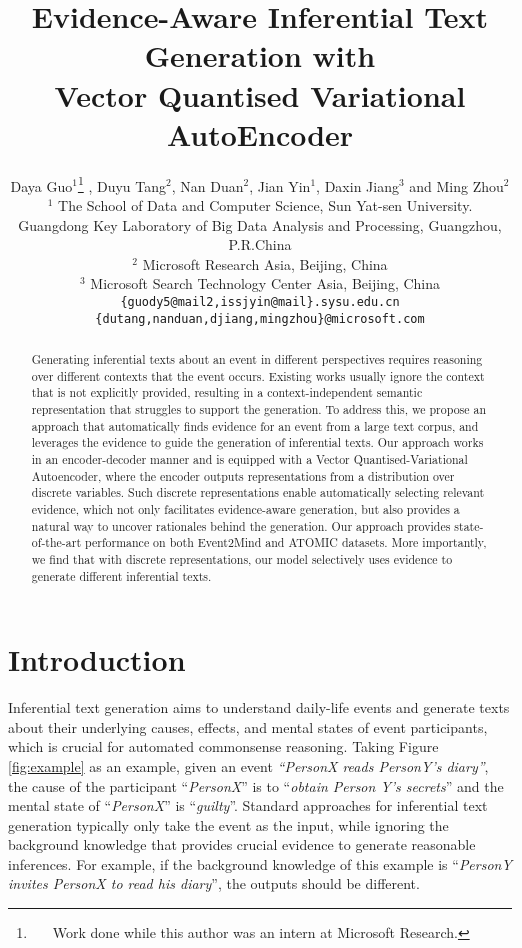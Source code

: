 \documentclass[11pt,a4paper]{article}
\title{
Evidence-Aware Inferential Text Generation with \\Vector Quantised Variational AutoEncoder 
}
\author{Daya Guo$^1$\thanks{\ \ \ Work done while this author was an intern at Microsoft Research.} , Duyu Tang$^2$, Nan Duan$^2$, Jian Yin$^1$, Daxin Jiang$^3$ and Ming Zhou$^2$\\
	$^1$ The School of Data and Computer Science, Sun Yat-sen University.\\
	Guangdong Key Laboratory of Big Data Analysis and Processing, Guangzhou, P.R.China\\
	$^2$ Microsoft Research Asia, Beijing, China \\
	$^3$ Microsoft Search Technology Center Asia, Beijing, China \\
	{\tt \{guody5@mail2,issjyin@mail\}.sysu.edu.cn}\\
	{\tt \{dutang,nanduan,djiang,mingzhou\}@microsoft.com}\\
}
\date{}
\begin{document}
\maketitle
\begin{abstract}



Generating inferential texts about an event in different perspectives requires reasoning over different contexts that the event occurs.
Existing works usually ignore the context that is not explicitly provided, resulting in a context-independent semantic representation that struggles to support the generation. 
To address this, we propose an approach that 
automatically \mbox{finds} evidence for an event from a large text corpus, and leverages the evidence to guide the generation of inferential texts. 
Our approach works in an encoder-decoder manner and is equipped with  a Vector Quantised-Variational Autoencoder, where the encoder outputs representations from a distribution over discrete variables. 
Such discrete representations 
enable automatically selecting relevant evidence, which not only facilitates evidence-aware generation, but also provides a natural way to uncover rationales behind the generation.
Our approach provides state-of-the-art performance on both Event2Mind and ATOMIC datasets.
More importantly, we find that with discrete representations, our model 
\mbox{selectively} uses  evidence to generate different inferential texts.










\end{abstract}

\section{Introduction}
Inferential text generation aims to understand daily-life events and generate texts about their underlying causes, effects, and mental states of event participants, which is crucial for automated commonsense reasoning. 
Taking Figure \ref{fig:example} as an example, given an event \textit{``PersonX reads PersonY's diary''}, the cause of the participant ``\textit{PersonX}'' is to ``\textit{obtain Person Y's secrets}'' and the mental state of ``\textit{PersonX}'' is ``\textit{guilty}''. 
Standard approaches for inferential text generation \cite{rashkin2018event2mind,sap2019atomic,Bosselut2019COMETCT,du2019modeling} typically only take the event as the input, while ignoring the background knowledge that provides crucial evidence to generate reasonable inferences. 
For example, if the background knowledge of this example is ``\textit{PersonY invites PersonX to read his diary}'', the outputs should be different.
\end{document}

